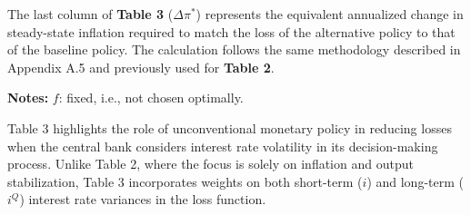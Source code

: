 \documentclass[12pt]{article}
\begin{document}
The last column of \textbf{Table 3} (\(\Delta \pi^*\)) represents the equivalent annualized change in steady-state inflation required to match the loss of the alternative policy to that of the baseline policy. The calculation follows the same methodology described in Appendix A.5 and previously used for \textbf{Table 2}.





\begin{table}[H]
\centering
\caption{Optimised policy rules with interest rate stabilisation.}
\label{tab:policy_rules_interest_rate_stabilisation}
\begin{flushleft}
\textbf{Notes:} \( f \): fixed, i.e., not chosen optimally. \\
\end{flushleft}
\end{table}






Table 3 highlights the role of unconventional monetary policy in reducing losses when the central bank considers interest rate volatility in its decision-making process. Unlike Table 2, where the focus is solely on inflation and output stabilization, Table 3 incorporates weights on both short-term (\(i\)) and long-term (\(i^Q\)) interest rate variances in the loss function.
\end{document}
